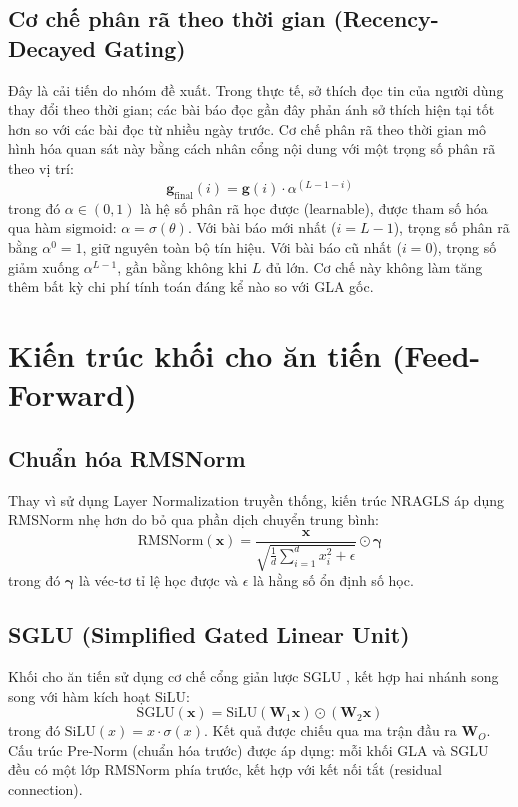 \documentclass[../BTL.tex]{subfiles}
\begin{document}
\subsection{Cơ chế phân rã theo thời gian (Recency-Decayed Gating)}

Đây là cải tiến do nhóm đề xuất. Trong thực tế, sở thích đọc tin của người dùng thay đổi theo thời gian; các bài báo đọc gần đây phản ánh sở thích hiện tại tốt hơn so với các bài đọc từ nhiều ngày trước. Cơ chế phân rã theo thời gian mô hình hóa quan sát này bằng cách nhân cổng nội dung với một trọng số phân rã theo vị trí:
\begin{equation}
    \mathbf{g}_{\text{final}}(i) = \mathbf{g}(i) \cdot \alpha^{(L-1-i)}
\end{equation}
trong đó $\alpha \in (0, 1)$ là hệ số phân rã học được (learnable), được tham số hóa qua hàm sigmoid: $\alpha = \sigma(\theta)$. Với bài báo mới nhất ($i = L-1$), trọng số phân rã bằng $\alpha^0 = 1$, giữ nguyên toàn bộ tín hiệu. Với bài báo cũ nhất ($i = 0$), trọng số giảm xuống $\alpha^{L-1}$, gần bằng không khi $L$ đủ lớn. Cơ chế này không làm tăng thêm bất kỳ chi phí tính toán đáng kể nào so với GLA gốc.

\section{Kiến trúc khối cho ăn tiến (Feed-Forward)}

\subsection{Chuẩn hóa RMSNorm}

Thay vì sử dụng Layer Normalization truyền thống, kiến trúc NRAGLS áp dụng RMSNorm \cite{zhang2019rms} nhẹ hơn do bỏ qua phần dịch chuyển trung bình:
\begin{equation}
    \text{RMSNorm}(\mathbf{x}) = \frac{\mathbf{x}}{\sqrt{\frac{1}{d}\sum_{i=1}^{d}x_i^2 + \epsilon}} \odot \boldsymbol{\gamma}
\end{equation}
trong đó $\boldsymbol{\gamma}$ là véc-tơ tỉ lệ học được và $\epsilon$ là hằng số ổn định số học.

\subsection{SGLU (Simplified Gated Linear Unit)}

Khối cho ăn tiến sử dụng cơ chế cổng giản lược SGLU \cite{dauphin2017glu}, kết hợp hai nhánh song song với hàm kích hoạt SiLU:
\begin{equation}
    \text{SGLU}(\mathbf{x}) = \text{SiLU}(\mathbf{W}_1 \mathbf{x}) \odot (\mathbf{W}_2 \mathbf{x})
\end{equation}
trong đó $\text{SiLU}(x) = x \cdot \sigma(x)$. Kết quả được chiếu qua ma trận đầu ra $\mathbf{W}_O$. Cấu trúc Pre-Norm (chuẩn hóa trước) được áp dụng: mỗi khối GLA và SGLU đều có một lớp RMSNorm phía trước, kết hợp với kết nối tắt (residual connection).
\end{document}
